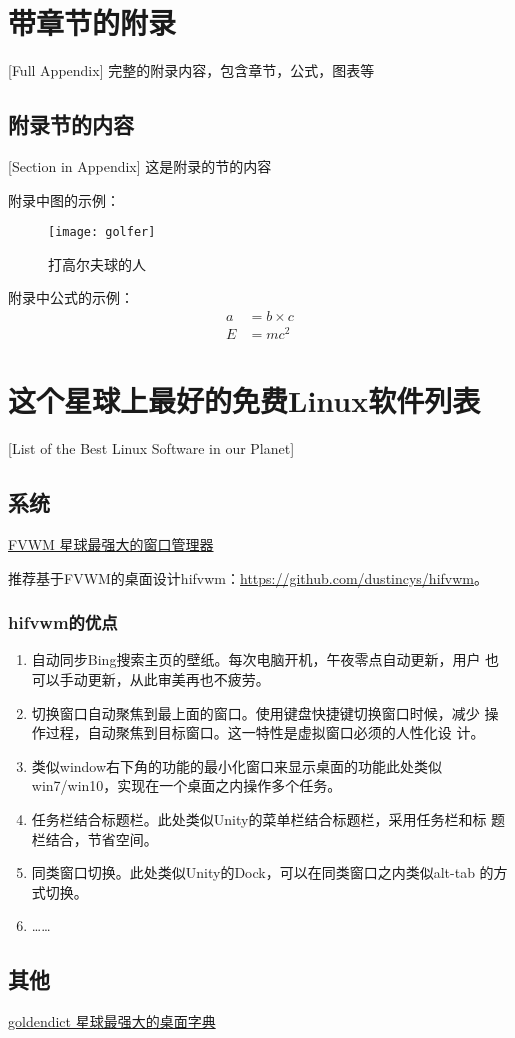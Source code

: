 \chapter{带章节的附录}[Full Appendix]%
完整的附录内容，包含章节，公式，图表等

\section{附录节的内容}[Section in Appendix]
这是附录的节的内容

附录中图的示例：
\begin{figure}[htbp]
\centering
\texttt{[image: golfer]}
\caption{\xiaosi[0]打高尔夫球的人}
\end{figure}

附录中公式的示例：
\begin{align}
a & = b \times c \\
E & = m c^2
\label{eq}
\end{align}

\chapter{这个星球上最好的免费Linux软件列表}[List of the Best Linux Software in our Planet]
\section{系统}

\href{http://fvwm.org/}{FVWM 星球最强大的窗口管理器}

推荐基于FVWM的桌面设计hifvwm：\href{https://github.com/dustincys/hifvwm}{https://github.com/dustincys/hifvwm}。

\subsection{hifvwm的优点}

\begin{enumerate}
	\item 自动同步Bing搜索主页的壁纸。每次电脑开机，午夜零点自动更新，用户
		也可以手动更新，从此审美再也不疲劳。
	\item 切换窗口自动聚焦到最上面的窗口。使用键盘快捷键切换窗口时候，减少
		操作过程，自动聚焦到目标窗口。这一特性是虚拟窗口必须的人性化设
		计。
	\item 类似window右下角的功能的最小化窗口来显示桌面的功能此处类似
		win7/win10，实现在一个桌面之内操作多个任务。
	\item 任务栏结合标题栏。此处类似Unity的菜单栏结合标题栏，采用任务栏和标
		题栏结合，节省空间。
	\item 同类窗口切换。此处类似Unity的Dock，可以在同类窗口之内类似alt-tab
		的方式切换。
	\item ……
\end{enumerate}

\section{其他}

\href{https://github.com/goldendict/goldendict}{goldendict 星球最强大的桌面字典}
